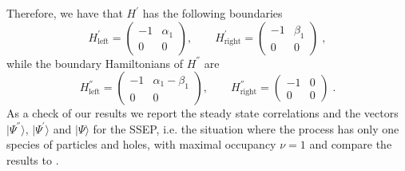 \documentclass[10pt]{article}
\numberwithin{equation}{section}
\numberwithin{equation}{subsection}
\newcommand{\co}{\;,}
\newcommand{\dt}{\;.}
\begin{document}
Therefore, we have that $H^{'}$ has the following boundaries
\begin{equation}
	H^{'}_{\text{left}}=\begin{pmatrix}
		-1&\alpha_{1}\\
		0&0
	\end{pmatrix},\qquad H^{'}_{\text{right}}=\begin{pmatrix}
	-1&\beta_{1}\\
	0&0
\end{pmatrix}\co
\end{equation}
while the boundary Hamiltonians of $H^{''}$ are
\begin{equation}
	H^{''}_{\text{left}}=\begin{pmatrix}
		-1&\alpha_{1}-\beta_{1}\\
		0&0
	\end{pmatrix},\qquad H^{''}_{\text{right}}=\begin{pmatrix}
	-1&0\\
	0&0
\end{pmatrix}\dt
\end{equation}
{As a check of our results we report the steady state correlations and the vectors $|\Psi^{''}\rangle$, $|\Psi^{'}\rangle$ and $|\Psi\rangle$ for the SSEP, i.e. the situation where the process has only one species of particles and holes, with maximal occupancy $\nu=1$ and compare the results to \cite{frassek2020eigenstates}. }
\end{document}
